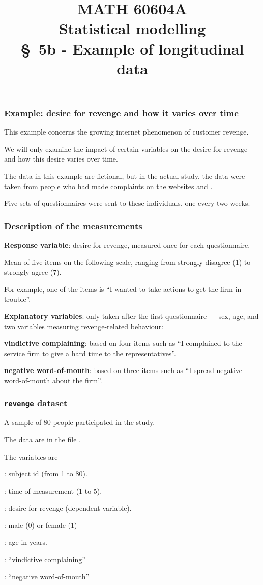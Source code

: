 \documentclass{beamer}
\title[\color{white}{MATH 60604A \S~5b - Example of longitudinal data}]{\texorpdfstring{MATH 60604A \\Statistical modelling \\ \S~5b - Example of longitudinal data}{MATH 60604A \\Statistical modelling \\ \S~5b - Example of longitudinal data}}
\author{}
\institute{HEC Montréal\\
Department of Decision Sciences}
\date{}
\begin{document}
\frame{\titlepage}

\begin{frame}
\frametitle{Example: desire for revenge and how it varies over time}
\bi
\item This example concerns the growing internet phenomenon of customer revenge. 
\item We will only examine the impact of certain variables on the desire for revenge and how this desire varies over time. 

\item The data in this example are fictional, but in the actual study, the data were taken from people who had made complaints on the websites  and .
\item Five sets of questionnaires were sent to these individuals, one every two weeks.
\ei
\end{frame}

\begin{frame}
\frametitle{Description of the measurements}
\bi
\item \textbf{Response variable}: desire for revenge, measured once for each questionnaire. 
\bi
\item Mean of five items on the following scale, ranging from strongly disagree  ($1$) to strongly agree ($7$).
\bi 
\item For example, one of the items is ``I wanted to take actions to get the firm in trouble''.
\ei
\ei
\item \textbf{Explanatory variables}: only taken after the first questionnaire --- sex, age, and two variables measuring revenge-related behaviour:
\bi
\item \textbf{vindictive complaining}: based on four items such as ``I complained to the service firm to give a hard time to the representatives''.
\item \textbf{negative word-of-mouth}: based on three items such as ``I spread negative word-of-mouth about the firm''.
\ei
\ei
\end{frame}

\begin{frame}
\frametitle{\texttt{revenge} dataset}
\bi
\item A sample of 80 people participated in the study. 
\item The data are in the file . 
\item The variables are
\bi

\item {}: subject id (from 1 to 80).
\item {}: time of measurement (1 to 5).
\item {}: desire for revenge (dependent variable).
\item {}: male (0) or female (1)
\item {}: age in years.
\item {}: ``vindictive complaining''
\item {}: ``negative word-of-mouth''
\ei
\ei
\end{frame}
\end{document}
